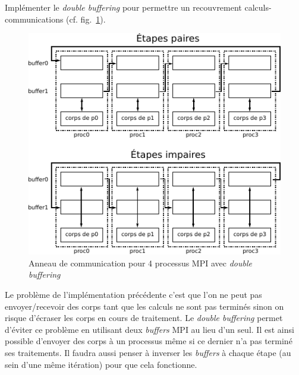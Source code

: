 \begin{questions}
	\question Implémenter le \textit{double buffering} pour permettre un recouvrement calculs-communications (cf. fig.~\ref{fig:anneauDB}).\\
	\begin{figure}[htbp]
		\centering
		\includegraphics[width=0.65\linewidth]{schemas/anneau_avec_buffering.pdf}
		\caption{Anneau de communication pour 4 processus MPI avec \textit{double buffering}}
		\label{fig:anneauDB}
	\end{figure}
	\begin{solution}
		Le problème de l'implémentation précédente c'est que l'on ne peut pas envoyer/recevoir des corps tant que les calculs ne sont pas terminés sinon on risque d'écraser les corps en cours de traitement.
		Le \textit{double buffering} permet d'éviter ce problème en utilisant deux \textit{buffers} MPI au lieu d'un seul.
		Il est ainsi possible d'envoyer des corps à un processus même si ce dernier n'a pas terminé ses traitements.
		Il faudra aussi penser à inverser les \textit{buffers} à chaque étape (au sein d'une même itération) pour que cela fonctionne.
	\end{solution}
\end{questions}
